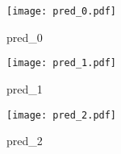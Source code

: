 \begin{answer}
\begin{figure}[H]
    \centering
    \texttt{[image: pred\_0.pdf]}
    \caption{pred\_0}
    \label{fig:enter-label}
\end{figure}

\begin{figure}[H]
    \centering
    \texttt{[image: pred\_1.pdf]}
    \caption{pred\_1}
    \label{fig:enter-label}
\end{figure}

\begin{figure}[H]
    \centering
    \texttt{[image: pred\_2.pdf]}
    \caption{pred\_2}
    \label{fig:enter-label}
\end{figure}
\end{answer}
